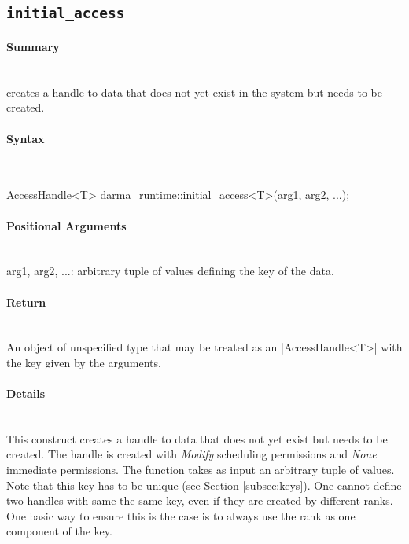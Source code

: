 \subsection{\texttt{initial\_access}}

\paragraph{Summary}\mbox{}\\ 
 creates a handle to data that does not yet exist in the system 
but needs to be created.

\paragraph{Syntax}\mbox{}\\ 
\begin{CppCode}
AccessHandle<T> darma_runtime::initial_access<T>(arg1, arg2, ...);
\end{CppCode}

\paragraph{Positional Arguments}\mbox{}\\ 
arg1, arg2, ...: arbitrary tuple of values defining the key of the data.

\paragraph{Return}\mbox{}\\ 
An object of unspecified type that may be treated as an |AccessHandle<T>|
with the key given by the arguments.

\paragraph{Details}\mbox{}\\ 
This construct creates a handle to data that does not yet 
exist but needs to be created.  The handle is created with {\it Modify}
scheduling permissions and {\it None} immediate permissions.  The function takes
as input an arbitrary tuple of values.
Note that this key has to be unique (see Section \ref{subsec:keys}).
One cannot define two handles with same the same key, even if they are created by different ranks.
One basic way to ensure this is the case is to always use the rank 
as one component of the key. 

